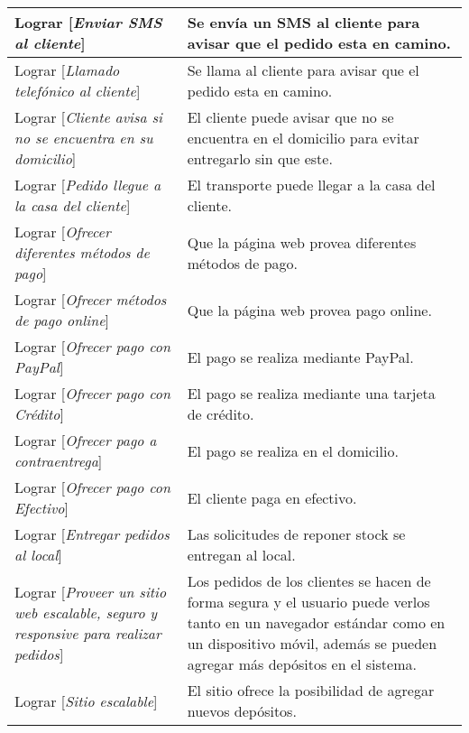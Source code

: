 \begin{center}
\begin{longtable}{p{7cm} p{7cm}}
Lograr [\textit{Enviar SMS al cliente}] & Se envía un SMS al cliente para avisar que el pedido esta en camino. \\[0.2em] \hline

Lograr [\textit{Llamado telefónico al cliente}] & Se llama al cliente para avisar que el pedido esta en camino. \\[0.2em] \hline

Lograr [\textit{Cliente avisa si no se encuentra en su domicilio}] & El cliente puede avisar que no se encuentra en el domicilio para evitar entregarlo sin que este. \\[0.2em] \hline

Lograr [\textit{Pedido llegue a la casa del cliente}] & El transporte puede llegar a la casa del cliente. \\[0.2em] \hline

Lograr [\textit{Ofrecer diferentes métodos de pago}] & Que la página web provea diferentes métodos de pago. \\[0.2em] \hline

Lograr [\textit{Ofrecer métodos de pago online}] & Que la página web provea pago online. \\[0.2em] \hline

Lograr [\textit{Ofrecer pago con PayPal}] & El pago se realiza mediante PayPal. \\[0.2em] \hline

Lograr [\textit{Ofrecer pago con Crédito}] & El pago se realiza mediante una tarjeta de crédito. \\[0.2em] \hline

Lograr [\textit{Ofrecer pago a contraentrega}] & El pago se realiza en el domicilio. \\[0.2em] \hline

Lograr [\textit{Ofrecer pago con Efectivo}] & El cliente paga en efectivo. \\[0.2em] \hline

Lograr [\textit{Entregar pedidos al local}] & Las solicitudes de reponer stock se entregan al local. \\[0.2em] \hline

Lograr [\textit{Proveer un sitio web escalable, seguro y responsive para realizar pedidos}] & Los pedidos de los clientes se hacen de forma segura y el usuario puede verlos tanto en un navegador estándar como en un dispositivo móvil, además se pueden agregar más depósitos en el sistema. \\[0.2em] \hline

Lograr [\textit{Sitio escalable}] & El sitio ofrece la posibilidad de agregar nuevos depósitos. \\[0.2em] \hline


\end{longtable}
\end{center}

